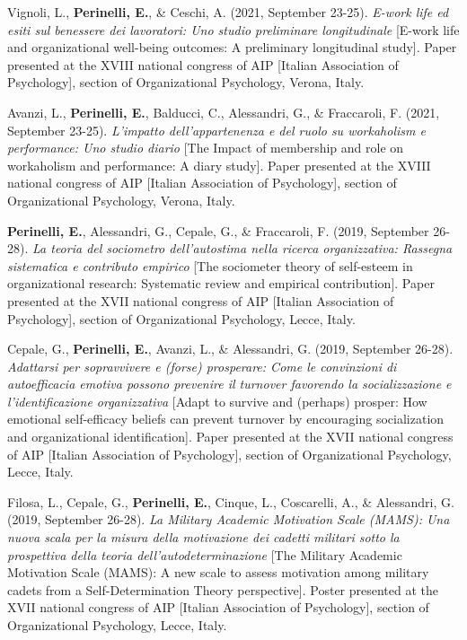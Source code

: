 \documentclass[hidelinks, letterpaper,10pt]{article} %
\begin{document}
\begin{etaremune}
	\item Vignoli, L., \textbf{Perinelli, E.}, \& Ceschi, A. (2021, September 23-25). \textit{E-work life ed esiti sul benessere dei lavoratori: Uno studio preliminare longitudinale} [E-work life and organizational well-being outcomes: A preliminary longitudinal study]. Paper presented at the XVIII national congress of AIP [Italian Association of Psychology], section of Organizational Psychology, Verona, Italy.

    \item Avanzi, L., \textbf{Perinelli, E.}, Balducci, C., Alessandri, G., \& Fraccaroli, F. (2021, September 23-25). \textit{L’impatto dell'appartenenza e del ruolo su workaholism e performance: Uno studio diario} [The Impact of membership and role on workaholism and performance: A diary study]. Paper presented at the XVIII national congress of AIP [Italian Association of Psychology], section of Organizational Psychology, Verona, Italy.

    \item \textbf{Perinelli, E.}, Alessandri, G., Cepale, G., \& Fraccaroli, F. (2019, September 26-28). \textit{La teoria del sociometro dell’autostima nella ricerca organizzativa: Rassegna sistematica e contributo empirico} [The sociometer theory of self-esteem in organizational research: Systematic review and empirical contribution]. Paper presented at the XVII national congress of AIP [Italian Association of Psychology], section of Organizational Psychology, Lecce, Italy.

    \item Cepale, G., \textbf{Perinelli, E.}, Avanzi, L., \& Alessandri, G. (2019, September 26-28). \textit{Adattarsi per sopravvivere e (forse) prosperare: Come le convinzioni di autoefficacia emotiva possono prevenire il turnover favorendo la socializzazione e l’identificazione organizzativa} [Adapt to survive and (perhaps) prosper: How emotional self-efficacy beliefs can prevent turnover by encouraging socialization and organizational identification]. Paper presented at the XVII national congress of AIP [Italian Association of Psychology], section of Organizational Psychology, Lecce, Italy.

    \item Filosa, L., Cepale, G., \textbf{Perinelli, E.}, Cinque, L., Coscarelli, A., \& Alessandri, G. (2019, September 26-28). \textit{La Military Academic Motivation Scale (MAMS): Una nuova scala per la misura della motivazione dei cadetti militari sotto la prospettiva della teoria dell’autodeterminazione} [The Military Academic Motivation Scale (MAMS): A new scale to assess motivation among military cadets from a Self-Determination Theory perspective]. Poster presented at the XVII national congress of AIP [Italian Association of Psychology], section of Organizational Psychology, Lecce, Italy.


\end{etaremune}
\end{document}
